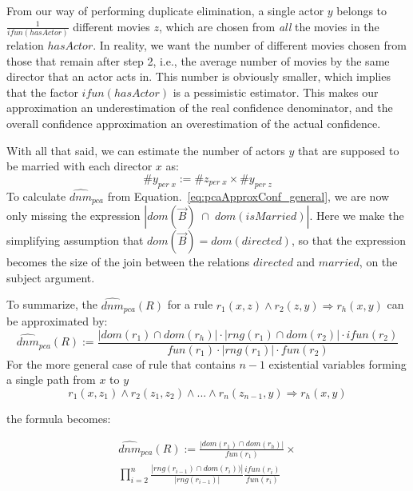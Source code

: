 {From our way of performing duplicate elimination, a single actor $y$ belongs to $\frac{1}{ifun(hasActor)}$ different movies $z$, 
which are chosen from \emph{all} the movies in the relation $hasActor$.
In reality, we want the number of different movies chosen from those that remain after step 2, %
i.e., the average number of movies by the same director that an actor acts in. This number is obviously smaller, which
implies that the factor $ifun(hasActor)$ is a pessimistic estimator. This makes 
our approximation an underestimation of the real confidence denominator, 
and the overall confidence approximation an overestimation of the actual confidence.

With all that said, we can estimate the number of actors $y$ that are supposed to be married with each director $x$ as:
$$
 \#y_{per\;x} :=  \#z_{per \; x} \times \#y_{ per \; z}
$$
\noindent To calculate $\widehat{dnm}_{pca}$ from Equation.~\ref{eq:pcaApproxConf_general}, we are now only missing 
the expression $|dom(\vec{B})\;\cap\;dom(isMarried)|$. 
Here we make the simplifying assumption that $dom(\vec{B}) = dom(directed)$, so that the expression
becomes the size of the join between the relations $directed$ and $married$, on the subject argument.

To summarize, the $ \widehat{dnm}_{pca}(R)$ for a rule $r_1(x,z)\wedge r_2(z,y) \Rightarrow r_h(x,y)$ can be approximated by:
\[
  \widehat{dnm}_{pca}(R) := \frac{|dom(r_1) \cap dom(r_h)| \cdot |rng(r_1) \cap dom(r_2)| \cdot ifun(r_2)  }{fun(r_1) \cdot |rng(r_1)| \cdot fun(r_2)}
\]
For the more general case of rule that contains $n-1$ existential variables forming a single path from $x$ to $y$
$$
  r_1(x,z_1) \wedge r_2(z_1,z_2) \wedge ... \wedge r_n(z_{n-1},y) \Rightarrow r_h(x,y)
$$

\noindent the formula becomes:

\begin{eqnarray*}
  \widehat{dnm}_{pca}(R) := \frac{|dom(r_1) \cap dom(r_h)|}{fun(r_1)}  \times \\
  \prod_{i=2}^{n}\frac{|rng(r_{i-1})\cap dom(r_i))|}{|rng(r_{i-1})|}\frac{ifun(r_i)}{fun(r_i)}
\end{eqnarray*}

}
